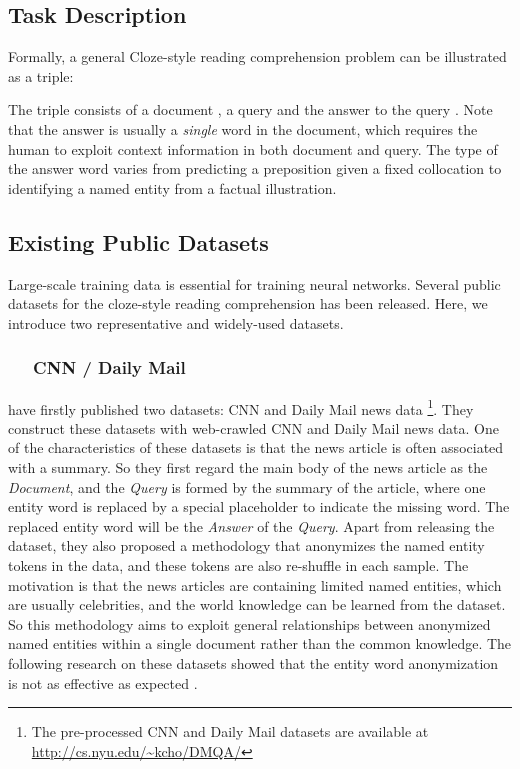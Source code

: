 \documentclass[11pt,a4paper]{article}
\begin{document}
\subsection{Task Description}
Formally, a general Cloze-style reading comprehension problem can be illustrated as a triple:

The triple consists of a document  , a query  and the answer to the query . 
Note that the answer is usually a {\em single} word in the document, which requires the human to exploit context information in both document and query.
The type of the answer word varies from predicting a preposition given a fixed collocation to identifying a named entity from a factual illustration.

\subsection{Existing Public Datasets}
Large-scale training data is essential for training neural networks.
Several public datasets for the cloze-style reading comprehension has been released. 
Here, we introduce two representative and widely-used datasets.

\subsubsection*{~~ CNN / Daily Mail}
 have firstly published two datasets: CNN and Daily Mail news data \footnote{The pre-processed CNN and Daily Mail datasets are available at \url{http://cs.nyu.edu/~kcho/DMQA/}}.
They construct these datasets with web-crawled CNN and Daily Mail news data. 
One of the characteristics of these datasets is that the news article is often associated with a summary. 
So they first regard the main body of the news article as the {\em Document}, and the {\em Query} is formed by the summary of the article, where one entity word is replaced by a special placeholder to indicate the missing word. 
The replaced entity word will be the {\em Answer} of the {\em Query}.  
Apart from releasing the dataset, they also proposed a methodology that anonymizes the named entity tokens in the data, and these tokens are also re-shuffle in each sample. The motivation is that the news articles are containing limited named entities, which are usually celebrities, and the world knowledge can be learned from the dataset. So this methodology aims to exploit general relationships between anonymized named entities within a single document rather than the common knowledge.
The following research on these datasets showed that the entity word anonymization is not as effective as expected \citep{chen-etal-2016}.
\end{document}
